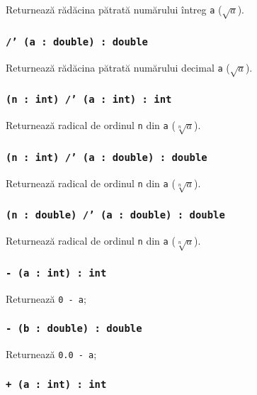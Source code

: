 Returnează rădăcina pătrată numărului întreg \texttt{a} ($\sqrt{a}$).

\subsubsection{\texttt{/' (a : double) : double}}

Returnează rădăcina pătrată numărului decimal \texttt{a} ($\sqrt{a}$).

\subsubsection{\texttt{(n : int) /' (a : int) : int}}

Returnează radical de ordinul \texttt{n} din \texttt{a} ($\sqrt[n]{a}$).

\subsubsection{\texttt{(n : int) /' (a : double) : double}}

Returnează radical de ordinul \texttt{n} din \texttt{a} ($\sqrt[n]{a}$).

\subsubsection{\texttt{(n : double) /' (a : double) : double}}

Returnează radical de ordinul \texttt{n} din \texttt{a} ($\sqrt[n]{a}$).


\subsubsection{\texttt{- (a : int) : int}}

Returnează \texttt{0 - a};

\subsubsection{\texttt{- (b : double) : double}}

Returnează \texttt{0.0 - a};

\subsubsection{\texttt{+ (a : int) : int}}

